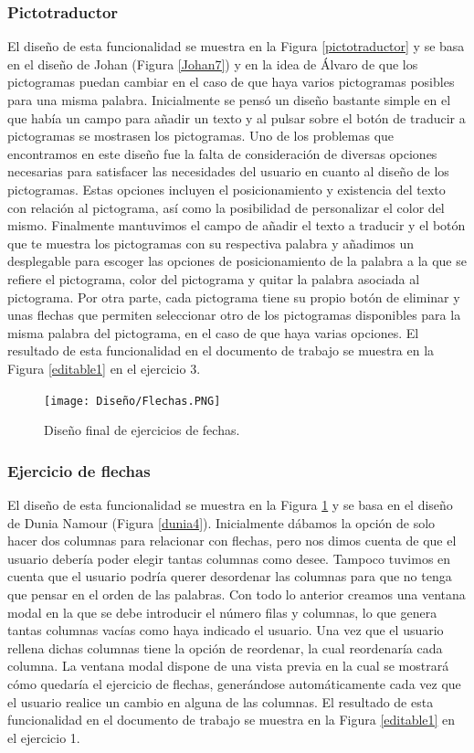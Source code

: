 \subsubsection{Pictotraductor}
El diseño de esta funcionalidad se muestra en la Figura \ref{pictotraductor} y se basa en el diseño de Johan (Figura \ref{Johan7}) y en la idea de Álvaro de que los pictogramas puedan cambiar en el caso de que haya varios pictogramas posibles para una misma palabra. Inicialmente se pensó un diseño bastante simple en el que había un campo para añadir un texto y al pulsar sobre el botón de traducir a pictogramas se mostrasen los pictogramas. Uno de los problemas que encontramos en este diseño fue la falta de consideración de diversas opciones necesarias para satisfacer las necesidades del usuario en cuanto al diseño de los pictogramas. Estas opciones incluyen el posicionamiento y existencia del texto con relación al pictograma, así como la posibilidad de personalizar el color del mismo. Finalmente mantuvimos el campo de añadir el texto a traducir y el botón que te muestra los pictogramas con su respectiva palabra y añadimos un desplegable para escoger las opciones de posicionamiento de la palabra a la que se refiere el pictograma, color del pictograma y quitar la palabra asociada al pictograma. Por otra parte, cada pictograma tiene su propio botón de eliminar y unas flechas que permiten seleccionar otro de los pictogramas disponibles para la misma palabra del pictograma, en el caso de que haya varias opciones. El resultado de esta funcionalidad en el documento de trabajo se muestra en la Figura \ref{editable1} en el ejercicio 3.

\begin{figure}[ht!]
  \centering
  \texttt{[image: Diseño/Flechas.PNG]}
  \caption{Diseño final de ejercicios de fechas.}
  \label{flechas}
\end{figure}

\subsubsection{Ejercicio de flechas}
El diseño de esta funcionalidad se muestra en la Figura \ref{flechas} y se basa en el diseño de Dunia Namour (Figura \ref{dunia4}). Inicialmente dábamos la opción de solo hacer dos columnas para relacionar con flechas, pero nos dimos cuenta de que el usuario debería poder elegir tantas columnas como desee. Tampoco tuvimos en cuenta que el usuario podría querer desordenar las columnas para que no tenga que pensar en el orden de las palabras. Con todo lo anterior creamos una ventana modal en la que se debe introducir el número filas y columnas, lo que genera tantas columnas vacías como haya indicado el usuario. Una vez que el usuario rellena dichas columnas tiene la opción de reordenar, la cual reordenaría cada columna. La ventana modal dispone de una vista previa en la cual se mostrará cómo quedaría el ejercicio de flechas, generándose automáticamente cada vez que el usuario realice un cambio en alguna de las columnas. El resultado de esta funcionalidad en el documento de trabajo se muestra en la Figura \ref{editable1} en el ejercicio 1.


